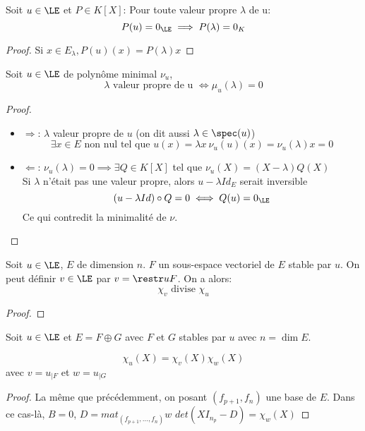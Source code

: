 \begin{prop}
	Soit $u \in \LE$ et $P \in K[X]$: Pour toute valeur propre $\lambda$ de u:
	$$ P(u) = 0_{\LE} \implies P(\lambda) = 0_K$$
\end{prop}

\begin{proof}
	Si $x \in E_\lambda , P(u)(x) = P(\lambda) x$ %
\end{proof}


\begin{prop}
	Soit $u \in \LE$ de polynôme minimal $\nu_u$,
	$$ \lambda \text{ valeur propre de u }\iff \mu_u(\lambda) = 0$$
\end{prop}


\begin{proof}
	\begin{itemize}
		\item  $\Rightarrow$:
		      $\lambda$ valeur propre de $u$ (on dit aussi $\lambda \in \spec(u)$)
		      $$\exists x \in E \text { non nul tel que } u(x) = \lambda x \ \nu_u(u)(x) = \nu_u(\lambda)x =0$$
		\item $\Leftarrow$:
		      $\nu_u(\lambda) = 0 \implies \exists Q \in K[X]$ tel que $\nu_u(X) = (X - \lambda)Q(X)$\\
		      Si $\lambda$ n'était pas une valeur propre, alors $u-\lambda Id_E$ serait inversible
		      $$ (u-  \lambda Id) \circ Q = 0 \iff Q(u) = 0_{\LE}$$
		      Ce qui contredit la minimalité de $\nu$.
	\end{itemize}
\end{proof}



\begin{prop}
	Soit $u \in \LE$, $E$ de dimension $n$.
	$F$ un sous-espace vectoriel de $E$ stable par $u$.
	On peut définir $v \in \LE$ par $v = \restr u F$. On a alors:
	$$\chi_v \text{ divise } \chi_u$$
\end{prop}

\begin{proof}
\end{proof}

\begin{prop}
	Soit $u \in \LE$ et $E = F \oplus G$ avec $F$ et $G$ stables par $u$ avec $n = \dim E$.

	$$\chi_u (X)= \chi_v (X) \chi_w(X)$$
	avec $v = u_{|F}$ et $w = u_{|G}$
\end{prop}

\begin{proof}
	La même que précédemment, on posant $(f_{p+1}, f_n)$ une base de $E$.
	Dans ce cas-là, $B = 0$, $D = mat_{(f_{p+1}, \dots, f_n)} w$
	$det(XI_{n_p} - D) = \chi_w(X)$
\end{proof}

